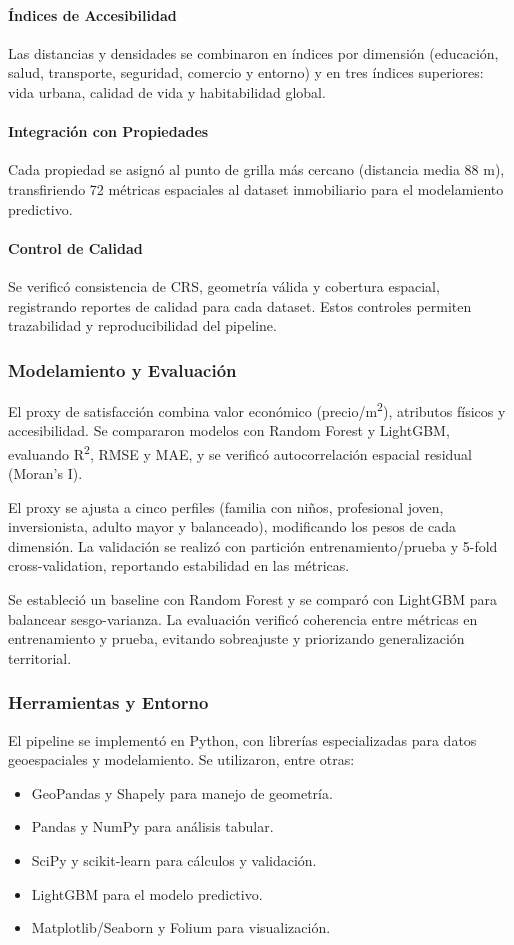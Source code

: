 \documentclass[11pt,letterpaper]{article}
\begin{document}
\paragraph{Índices de Accesibilidad}
Las distancias y densidades se combinaron en índices por dimensión (educación, salud, transporte, seguridad, comercio y entorno) y en tres índices superiores: vida urbana, calidad de vida y habitabilidad global.

\paragraph{Integración con Propiedades}
Cada propiedad se asignó al punto de grilla más cercano (distancia media 88 m), transfiriendo 72 métricas espaciales al dataset inmobiliario para el modelamiento predictivo.

\paragraph{Control de Calidad}
Se verificó consistencia de CRS, geometría válida y cobertura espacial, registrando reportes de calidad para cada dataset. Estos controles permiten trazabilidad y reproducibilidad del pipeline.

\subsubsection{Modelamiento y Evaluación}
El proxy de satisfacción combina valor económico (precio/m\textsuperscript{2}), atributos físicos y accesibilidad. Se compararon modelos con Random Forest y LightGBM, evaluando R\textsuperscript{2}, RMSE y MAE, y se verificó autocorrelación espacial residual (Moran's I).

El proxy se ajusta a cinco perfiles (familia con niños, profesional joven, inversionista, adulto mayor y balanceado), modificando los pesos de cada dimensión. La validación se realizó con partición entrenamiento/prueba y 5-fold cross-validation, reportando estabilidad en las métricas.

Se estableció un baseline con Random Forest y se comparó con LightGBM para balancear sesgo-varianza. La evaluación verificó coherencia entre métricas en entrenamiento y prueba, evitando sobreajuste y priorizando generalización territorial.

\subsubsection{Herramientas y Entorno}
El pipeline se implementó en Python, con librerías especializadas para datos geoespaciales y modelamiento. Se utilizaron, entre otras:
\begin{itemize}
    \item GeoPandas y Shapely para manejo de geometría.
    \item Pandas y NumPy para análisis tabular.
    \item SciPy y scikit-learn para cálculos y validación.
    \item LightGBM para el modelo predictivo.
    \item Matplotlib/Seaborn y Folium para visualización.
\end{itemize}
\end{document}
